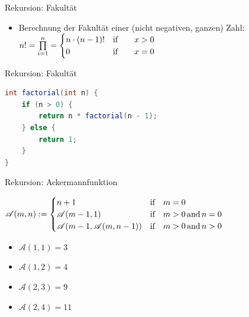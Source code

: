 \documentclass[18pt]{beamer}
\begin{document}
\begin{frame}{Rekursion: Fakultät}
    \begin{exampleblock}{}
        \begin{itemize}
            \item Berechnung der Fakultät einer (nicht negativen, ganzen) Zahl:\\
            \vspace{.2in}
            $
            n! = \prod\limits_{i=1}^{n} =
                \begin{cases}
                    n \cdot (n-1)! & \text{if\qquad} x > 0 \\
                    0 & \text{if\qquad} x = 0
                \end{cases}
            $
        \end{itemize}
    \end{exampleblock}
\end{frame}

\begin{frame}[fragile]{Rekursion: Fakultät}
    \begin{exampleblock}{}
        \begin{lstlisting}[language=Java,basicstyle=\scriptsize]
int factorial(int n) {
    if (n > 0) {
        return n * factorial(n - 1);
    } else {
        return 1;
    }
}
        \end{lstlisting}

    \end{exampleblock}

\end{frame}

\begin{frame}[fragile]{Rekursion: Ackermannfunktion}
    \begin{exampleblock}{}
        $
        \mathscr{A}(m, n) :=
        \begin{cases}
            n+1 & \text{if\quad} m = 0\\
            \mathscr{A}(m-1, 1) & \text{if\quad} m > 0 \text{\,and\,} n = 0\\
            \mathscr{A}(m-1, \mathscr{A}(m, n-1)) & \text{if\quad} m > 0 \text{\,and\,} n > 0
        \end{cases}
        $
    \end{exampleblock}
    \pause
    \begin{itemize}
        \item $\mathscr{A}(1, 1) = 3$
        \item $\mathscr{A}(1, 2) = 4$
        \item $\mathscr{A}(2, 3) = 9$
        \item $\mathscr{A}(2, 4) = 11$
    \end{itemize}
\end{frame}
\end{document}
